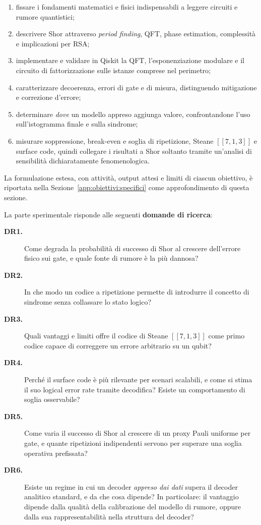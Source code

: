 \begin{onehalfspace}
\begin{enumerate}
    \item fissare i fondamenti matematici e fisici indispensabili a leggere circuiti e rumore quantistici;
    \item descrivere Shor attraverso \textit{period finding}, \ac{QFT}, phase estimation, complessità e implicazioni per \ac{RSA};
    \item implementare e validare in Qiskit la \ac{QFT}, l'esponenziazione modulare e il circuito di fattorizzazione sulle istanze comprese nel perimetro;
    \item caratterizzare decoerenza, errori di gate e di misura, distinguendo mitigazione e correzione d'errore;
    \item determinare \emph{dove} un modello appreso aggiunga valore, confrontandone l'uso sull'istogramma finale e sulla sindrome;
    \item misurare soppressione, break-even e soglia di ripetizione, Steane $[[7,1,3]]$ e surface code, quindi collegare i risultati a Shor soltanto tramite un'analisi di sensibilità dichiaratamente fenomenologica.
\end{enumerate}

La formulazione estesa, con attività, output attesi e limiti di ciascun obiettivo, è riportata nella Sezione~\ref{app:obiettivi:specifici} come approfondimento di questa sezione.

La parte sperimentale risponde alle seguenti \textbf{domande di ricerca}:

\begin{description}
    \item[\textbf{DR1.}] Come degrada la probabilità di successo di Shor al crescere dell'errore fisico sui gate, e quale fonte di rumore è la più dannosa?
    \item[\textbf{DR2.}] In che modo un codice a ripetizione permette di introdurre il concetto di sindrome senza collassare lo stato logico?
    \item[\textbf{DR3.}] Quali vantaggi e limiti offre il codice di Steane $[[7,1,3]]$ come primo codice capace di correggere un errore arbitrario su un qubit?
    \item[\textbf{DR4.}] Perché il surface code è più rilevante per scenari scalabili, e come si stima il suo logical error rate tramite decodifica? Esiste un comportamento di soglia osservabile?
    \item[\textbf{DR5.}] Come varia il successo di Shor al crescere di un proxy Pauli uniforme per gate, e quante ripetizioni indipendenti servono per superare una soglia operativa prefissata?
    \item[\textbf{DR6.}] Esiste un regime in cui un decoder \emph{appreso dai dati} supera il decoder analitico standard, e da che cosa dipende? In particolare: il vantaggio dipende dalla qualità della calibrazione del modello di rumore, oppure dalla sua rappresentabilità nella struttura del decoder?
\end{description}


\end{onehalfspace}
